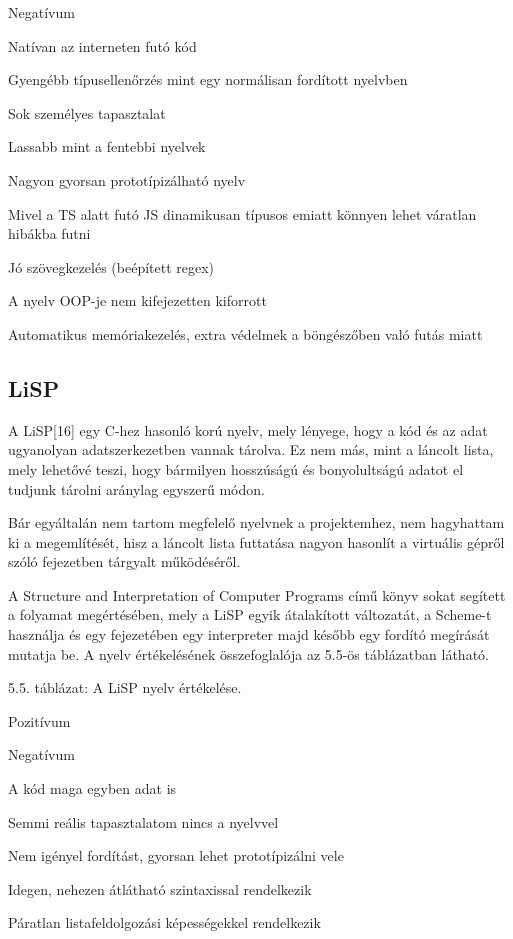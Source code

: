 Negatívum

Natívan az interneten futó kód

Gyengébb típusellenőrzés mint egy normálisan fordított nyelvben

Sok személyes tapasztalat

Lassabb mint a fentebbi nyelvek

Nagyon gyorsan prototípizálható nyelv

Mivel a TS alatt futó JS dinamikusan típusos emiatt könnyen lehet váratlan hibákba futni

Jó szövegkezelés (beépített regex)

A nyelv OOP-je nem kifejezetten kiforrott

Automatikus memóriakezelés, extra védelmek a böngészőben való futás miatt

\subsection{LiSP}

A LiSP[16] egy C-hez hasonló korú nyelv, mely lényege, hogy a kód és az adat ugyanolyan adatszerkezetben vannak tárolva. Ez nem más, mint a láncolt lista, mely lehetővé teszi, hogy bármilyen hosszúságú és bonyolultságú adatot el tudjunk tárolni aránylag egyszerű módon.

Bár egyáltalán nem tartom megfelelő nyelvnek a projektemhez, nem hagyhattam ki a megemlítését, hisz a láncolt lista futtatása nagyon hasonlít a virtuális gépről szóló fejezetben tárgyalt működéséről.

A Structure and Interpretation of Computer Programs\cite{sicp} című könyv sokat segített a folyamat megértésében, mely a LiSP egyik átalakított változatát, a Scheme-t használja és egy fejezetében egy interpreter majd később egy fordító megírását mutatja be. A nyelv értékelésének összefoglalója az 5.5-ös táblázatban látható.

5.5. táblázat: A LiSP nyelv értékelése.

Pozitívum

Negatívum

A kód maga egyben adat is

Semmi reális tapasztalatom nincs a nyelvvel

Nem igényel fordítást, gyorsan lehet prototípizálni vele

Idegen, nehezen átlátható szintaxissal rendelkezik

Páratlan listafeldolgozási képességekkel rendelkezik

